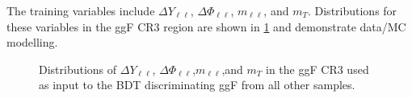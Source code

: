 The training variables include $\Delta Y_{\ell\ell}$, $\Delta \Phi_{\ell\ell}$, $m_{\ell\ell}$, and $m_T$. Distributions for these variables in the ggF CR3 region are shown in \ref{fig:ggFCR3} and demonstrate data/MC modelling.
\begin{figure}[!h]
  \hfill
  \hfill
  \hfill
  \hfill
{\caption{Distributions of $\Delta Y_{\ell\ell}$, $\Delta \Phi_{\ell\ell}$,$m_{\ell\ell}$,and $m_T$ in the ggF CR3 used as input to the BDT discriminating ggF from all other samples.
\label{fig:ggFCR3}}}
\end{figure} 

